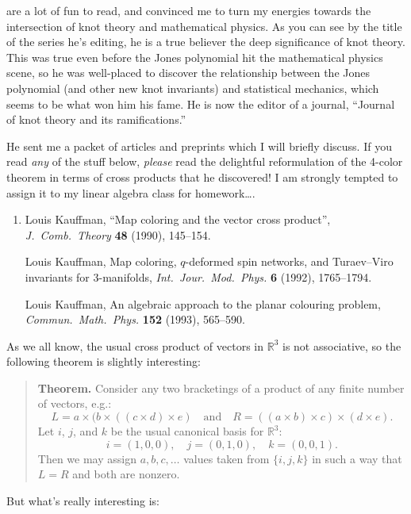 \documentclass{article}
\begin{document}
are a lot of fun to read, and convinced me to turn my energies towards
the intersection of knot theory and mathematical physics. As you can see
by the title of the series he's editing, he is a true believer the deep
significance of knot theory. This was true even before the Jones
polynomial hit the mathematical physics scene, so he was well-placed to
discover the relationship between the Jones polynomial (and other new
knot invariants) and statistical mechanics, which seems to be what won
him his fame. He is now the editor of a journal, ``Journal of knot
theory and its ramifications.''

He sent me a packet of articles and preprints which I will briefly
discuss. If you read \emph{any} of the stuff below, \emph{please} read
the delightful reformulation of the 4-color theorem in terms of cross
products that he discovered! I am strongly tempted to assign it to my
linear algebra class for homework\ldots.

\begin{enumerate}
\def\labelenumi{\arabic{enumi})}
\setcounter{enumi}{2}
\item
   Louis Kauffman, ``Map coloring and the vector cross product'',
  \emph{J.\ Comb.\ Theory} \textbf{48} (1990), 145--154.

   Louis Kauffman, Map coloring, $q$-deformed spin networks, and Turaev--Viro invariants
  for 3-manifolds, \emph{Int.\ Jour.\  Mod.\ Phys.}
  \textbf{6} (1992), 1765--1794.

   Louis Kauffman, An algebraic approach to the planar colouring problem, 
   \emph{Commun.\ Math.\ Phys.} \textbf{152} (1993), 565--590.
\end{enumerate}

As we all know, the usual cross product of vectors in \(\mathbb{R}^3\)
is not associative, so the following theorem is slightly interesting:

\begin{quote}
{\rm 
\textbf{Theorem.} Consider any two bracketings of a product of any
finite number of vectors, e.g.:
\[L = a \times (b \times ((c \times d) \times e) \quad\text{and}\quad  R = ((a \times b) \times c) \times (d \times e).\]
Let \(i\), \(j\), and \(k\) be the usual canonical basis for
\(\mathbb{R}^3\): \[i = (1,0,0), \quad j = (0,1,0), \quad k = (0,0,1).\]
Then we may assign \(a,b,c,\ldots\) values taken from \(\{i,j,k\}\) in
such a way that \(L = R\) and both are nonzero.
} 
\end{quote}

But what's really interesting is:
\end{document}
